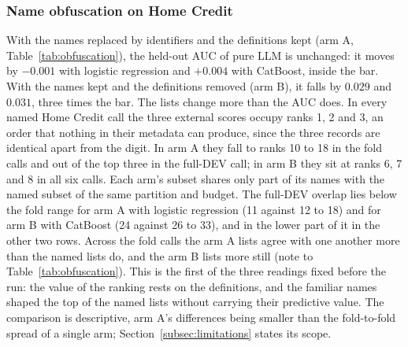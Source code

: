 \documentclass[final,5p,twocolumn]{elsarticle}
\begin{document}
\subsubsection{Name obfuscation on Home Credit}
\label{subsec:obfuscation_results}

With the names replaced by identifiers and the definitions kept (arm A, Table~\ref{tab:obfuscation}), the held-out AUC of pure LLM is unchanged: it moves by $-0.001$ with logistic regression and $+0.004$ with CatBoost, inside the bar. With the names kept and the definitions removed (arm B), it falls by $0.029$ and $0.031$, three times the bar. The lists change more than the AUC does. In every named Home Credit call the three external scores occupy ranks 1, 2 and 3, an order that nothing in their metadata can produce, since the three records are identical apart from the digit. In arm A they fall to ranks 10 to 18 in the fold calls and out of the top three in the full-DEV call; in arm B they sit at ranks 6, 7 and 8 in all six calls. Each arm's subset shares only part of its names with the named subset of the same partition and budget. The full-DEV overlap lies below the fold range for arm A with logistic regression (11 against 12 to 18) and for arm B with CatBoost (24 against 26 to 33), and in the lower part of it in the other two rows. Across the fold calls the arm A lists agree with one another more than the named lists do, and the arm B lists more still (note to Table~\ref{tab:obfuscation}). This is the first of the three readings fixed before the run: the value of the ranking rests on the definitions, and the familiar names shaped the top of the named lists without carrying their predictive value. The comparison is descriptive, arm A's differences being smaller than the fold-to-fold spread of a single arm; Section~\ref{subsec:limitations} states its scope.
\end{document}
